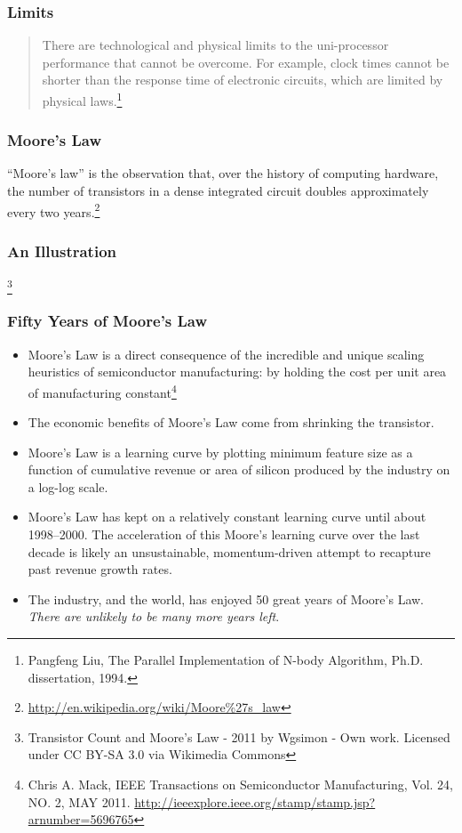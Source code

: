\documentclass{beamer}
\begin{document}
\begin{CJK}{UTF8}{bsmi}
\begin{frame}
\frametitle{Limits}
\begin{quote}There are technological and physical limits to the uni-processor performance that cannot be overcome. 
For example, clock times cannot be shorter than the response time of electronic circuits, which are limited by physical laws.\footnote{Pangfeng Liu, The Parallel Implementation of N-body Algorithm, Ph.D. dissertation, 1994.}
\end{quote}
\end{frame}

\begin{frame}
\frametitle{Moore's Law}
``Moore's law'' is the observation that, over the history of computing
hardware, the number of transistors in a dense integrated circuit
doubles approximately every two
years.\footnote{\url{http://en.wikipedia.org/wiki/Moore\%27s_law}}
\end{frame}

\begin{frame}
\frametitle{An Illustration}
\centerline{}\footnote{Transistor
  Count and Moore's Law - 2011 by Wgsimon - Own work. Licensed under
  CC BY-SA 3.0 via Wikimedia Commons}
\end{frame}

\begin{frame}
\frametitle{Fifty Years of Moore's Law}
\begin{itemize}
\item Moore's Law is a direct consequence of the incredible and unique
  scaling heuristics of semiconductor manufacturing: by holding the
  cost per unit area of manufacturing constant\footnote{Chris
    A. Mack, IEEE Transactions on Semiconductor Manufacturing,
    Vol. 24, NO. 2, MAY
    2011. \url{http://ieeexplore.ieee.org/stamp/stamp.jsp?arnumber=5696765}}
\item The economic benefits of Moore's Law come from shrinking the transistor.
\end{itemize}
\end{frame}

\begin{frame}
\begin{itemize}
\item Moore's Law is a learning curve by plotting minimum feature size as a function of cumulative revenue or area of silicon produced by the industry on a log-log scale.
\item Moore's Law has kept on a relatively constant learning curve until about 1998–2000. The acceleration of this Moore's learning curve over the last decade is likely an unsustainable, momentum-driven attempt to recapture past revenue growth rates.
\item The industry, and the world, has enjoyed 50 great years of Moore's Law. {\em There are unlikely to be many more years left}.
\end{itemize}
\end{frame}


\end{CJK}
\end{document}
